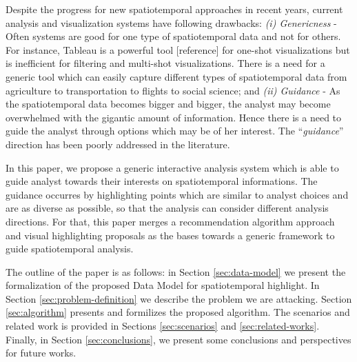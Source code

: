 Despite the progress for new spatiotemporal approaches in recent years, current
analysis and visualization systems have following drawbacks: \textit{(i)
Genericness} - Often systems are good for one type of spatiotemporal data and
not for others. For instance, Tableau is a powerful tool [reference] for
one-shot visualizations but is inefficient for filtering and multi-shot
visualizations. There is a need for a generic tool which can easily capture
different types of spatiotemporal data from agriculture to transportation to
flights to social science; and \textit{(ii) Guidance} - As the spatiotemporal
data becomes bigger and bigger, the analyst may become overwhelmed with the
gigantic amount of information. Hence there is a need to guide the analyst
through options which may be of her interest. The ``\textit{guidance}''
direction has been poorly addressed in the literature.            

In this paper, we propose a generic interactive analysis system which is able to
guide analyst towards their interests on spatiotemporal informations. The
guidance occurres by highlighting points which are similar to analyst choices and are as diverse as possible, so
that the analysis can consider different analysis directions. For that, this
paper merges a recommendation algorithm approach \cite{Omidvar-Tehrani:2015} and
visual highlighting proposals \cite{Lohmann:2012,Robinson2011,Liang2010} as the
bases towards a generic framework to guide spatiotemporal analysis.

The outline of the paper is as follows: in Section \ref{sec:data-model} we
present the formalization of the proposed Data Model for spatiotemporal
highlight. In Section \ref{sec:problem-definition} we describe the problem we
are attacking. Section \ref{sec:algorithm} presents and formilizes the proposed
algorithm. The scenarios and related work is provided in Sections \ref{sec:scenarios} and
\ref{sec:related-works}. Finally, in Section \ref{sec:conclusions}, we present 
some conclusions and perspectives for future works.